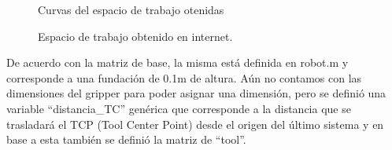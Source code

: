 \documentclass[a4paper,12pt]{article}
\begin{document}
\begin{figure}[H]
    \centering
    \begin{adjustbox}{max width=\columnwidth}
    \end{adjustbox}
    \caption{Curvas del espacio de trabajo otenidas}
\end{figure}

\begin{figure}[H]
    \centering
    \begin{adjustbox}{max width=\columnwidth}
    \end{adjustbox}
    \caption{Espacio de trabajo obtenido en internet.}
\end{figure}

De acuerdo con la matriz de base, la misma está definida en robot.m y corresponde a una
fundación de 0.1m de altura.
Aún no contamos con las dimensiones del gripper para poder asignar una dimensión, pero se
definió una variable ``distancia\_TC'' genérica que corresponde a la distancia que se trasladará
el TCP (Tool Center Point) desde el origen del último sistema y en base a esta también se definió
la matriz de ``tool''.
\end{document}
